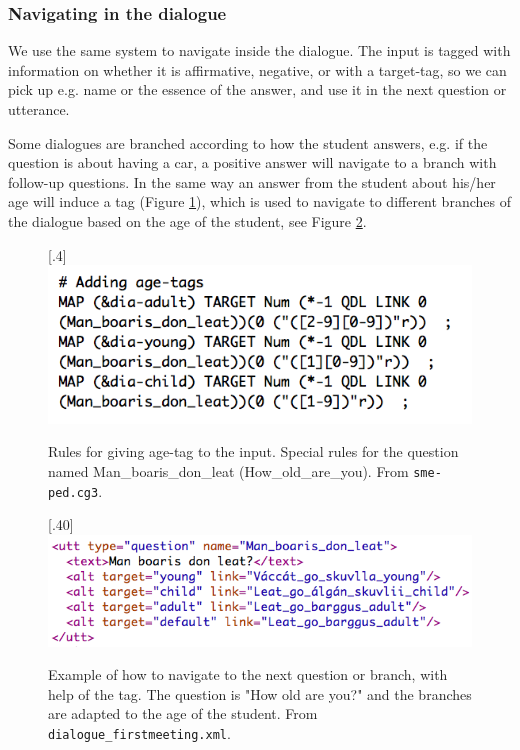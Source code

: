 \documentclass[11pt]{article}
\begin{document}
\subsubsection{Navigating in the dialogue}
We use the same system to navigate inside the dialogue. The input is tagged with information on whether it is affirmative, negative, or with a target-tag, so we can pick up e.g. name or the essence of the answer, and use it in the next question or utterance. 

Some dialogues are branched according to how the student answers, e.g. if the question is about having a car, a positive answer will navigate to a branch with follow-up questions. In the same way an answer from the student about his/her age will induce a tag (Figure \ref{age}), which is used to navigate to different branches of the dialogue based on the age of the student, see Figure \ref{branch}.


\begin{figure}[htbp]
\begin{center}
\scalebox{.4}[.4]{\includegraphics{presentation/img/picking_age2.png}}\\
\caption{Rules for giving age-tag to the input. Special rules for the question named Man\_boaris\_don\_leat (How\_old\_are\_you). From \texttt{sme-ped.cg3}.}
\label{age}
\end{center}
\end{figure}


\begin{figure}[htbp]
\begin{center}
\scalebox{.40}[.40]{\includegraphics{presentation/img/Man_boaris.png}}\\
\caption{Example of how to navigate to the next question or branch, with help of the tag. The question is "How old are you?" and the branches are adapted to the age of the student. From \texttt{dialogue\_firstmeeting.xml}.}
\label{branch}
\end{center}
\end{figure}
\end{document}
